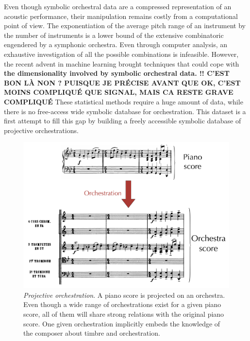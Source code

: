 \documentclass[twoside,twocolumn]{article}
\begin{document}
Even though symbolic orchestral data are a compressed representation of an acoustic performance, their manipulation remains costly from a computational point of view.
The exponentiation of the average pitch range of an instrument by the number of instruments is a lower bound of the extensive combinatoric engendered by a symphonic orchestra. Even through computer analysis, an exhaustive investigation of all the possible combinations is infeasible.
However, the recent advent in machine learning brought techniques that could cope with \textbf{the dimensionality involved by symbolic orchestral data. !! C'EST BON LÀ NON ? PUISQUE JE PRÉCISE AVANT QUE OK, C'EST MOINS COMPLIQUÉ QUE SIGNAL, MAIS CA RESTE GRAVE COMPLIQUÉ}
These statistical methods require a huge amount of data, while there is no free-access wide symbolic database for orchestration.
This dataset is a first attempt to fill this gap by building a freely accessible symbolic database of projective orchestrations.

\begin{figure}
\centering
\includegraphics[scale=0.14]{Data_representation/orch}
\caption{\textit{Projective orchestration}. A piano score is projected on an orchestra. Even though a wide range of orchestrations exist for a given piano score, all of them will share strong relations with the original piano score. One given orchestration implicitly embeds the knowledge of the composer about timbre and orchestration.}
\label{fig:orch}
\end{figure}
\end{document}
